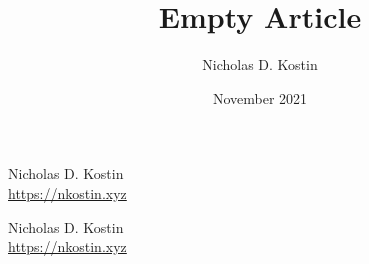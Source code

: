 \documentclass{article}
\title{Empty Article}
\author{Nicholas D. Kostin}
\date{November 2021}
\numberwithin{equation}{section}
\begin{document}
\maketitle

Nicholas D. Kostin \\
\url{https://nkostin.xyz}

\newpage

Nicholas D. Kostin \\
\url{https://nkostin.xyz}
\end{document}
